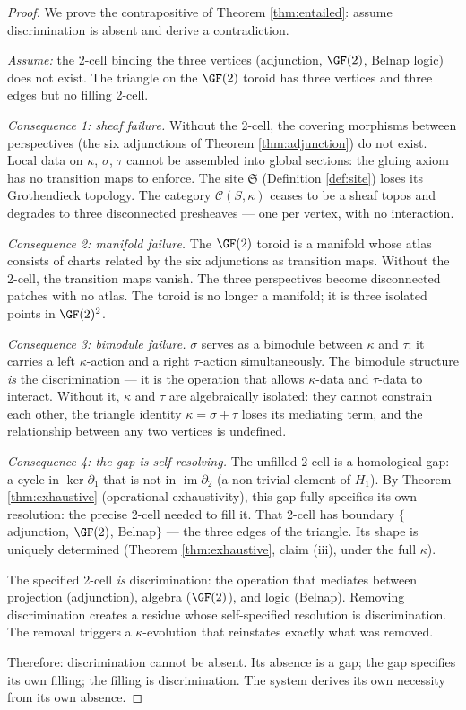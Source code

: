 \begin{proof}
We prove the contrapositive of Theorem \ref{thm:entailed}:
assume discrimination is absent and derive a contradiction.

\emph{Assume:} the 2-cell binding the three vertices
(adjunction, $\GF(2)$, Belnap logic) does not exist. The
triangle on the $\GF(2)$ toroid has three vertices and
three edges but no filling 2-cell.

\emph{Consequence 1: sheaf failure.}
Without the 2-cell, the covering morphisms between
perspectives (the six adjunctions of Theorem
\ref{thm:adjunction}) do not exist. Local data on
$\kappa$, $\sigma$, $\tau$ cannot be assembled into global
sections: the gluing axiom has no transition maps to
enforce. The site $\mathfrak{S}$ (Definition \ref{def:site})
loses its Grothendieck topology. The category
$\mathcal{C}(S,\kappa)$ ceases to be a sheaf topos and
degrades to three disconnected presheaves --- one per
vertex, with no interaction.

\emph{Consequence 2: manifold failure.}
The $\GF(2)$ toroid is a manifold whose atlas consists of
charts related by the six adjunctions as transition maps.
Without the 2-cell, the transition maps vanish. The three
perspectives become disconnected patches with no atlas.
The toroid is no longer a manifold; it is three isolated
points in $\GF(2)^2$.

\emph{Consequence 3: bimodule failure.}
$\sigma$ serves as a bimodule between $\kappa$ and $\tau$:
it carries a left $\kappa$-action and a right $\tau$-action
simultaneously. The bimodule structure \emph{is} the
discrimination --- it is the operation that allows
$\kappa$-data and $\tau$-data to interact. Without it,
$\kappa$ and $\tau$ are algebraically isolated: they
cannot constrain each other, the triangle identity
$\kappa = \sigma + \tau$ loses its mediating term, and the
relationship between any two vertices is undefined.

\emph{Consequence 4: the gap is self-resolving.}
The unfilled 2-cell is a homological gap: a cycle in
$\ker \partial_1$ that is not in $\operatorname{im}
\partial_2$ (a non-trivial element of $H_1$). By Theorem
\ref{thm:exhaustive} (operational exhaustivity), this gap
fully specifies its own resolution: the precise 2-cell
needed to fill it. That 2-cell has boundary
$\{$adjunction, $\GF(2)$, Belnap$\}$ --- the three edges
of the triangle. Its shape is uniquely determined
(Theorem \ref{thm:exhaustive}, claim (iii), under the
full $\kappa$).

The specified 2-cell \emph{is} discrimination: the
operation that mediates between projection (adjunction),
algebra ($\GF(2)$), and logic (Belnap). Removing
discrimination creates a residue whose self-specified
resolution is discrimination. The removal triggers a
$\kappa$-evolution that reinstates exactly what was
removed.

Therefore: discrimination cannot be absent. Its absence
is a gap; the gap specifies its own filling; the filling
is discrimination. The system derives its own necessity
from its own absence.
\end{proof}

